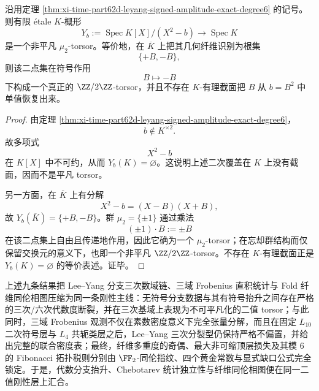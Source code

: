 \begin{proposition}\label{prop:xi-time-part62d-leyang-square-root-nontrivial-torsor}
沿用定理 \ref{thm:xi-time-part62d-leyang-signed-amplitude-exact-degree6} 的记号。则有限 \'etale \(K\)-概形
\[
Y_b:=\operatorname{Spec}K[X]/(X^2-b)
\longrightarrow
\operatorname{Spec}K
\]
是一个非平凡 \(\mu_2\)-torsor。等价地，在 \(\overline K\) 上把其几何纤维识别为根集
\[
\{+B,-B\},
\]
则该二点集在符号作用
\[
B\longmapsto -B
\]
下构成一个真正的 \(\ZZ/2\ZZ\)-torsor，并且不存在 \(K\)-有理截面把 \(B\) 从 \(b=B^2\) 中单值恢复出来。
\end{proposition}
\begin{proof}
由定理 \ref{thm:xi-time-part62d-leyang-signed-amplitude-exact-degree6}，
\[
b\notin K^{\times 2}.
\]
故多项式
\[
X^2-b
\]
在 \(K[X]\) 中不可约，从而 \(Y_b(K)=\varnothing\)。这说明上述二次覆盖在 \(K\) 上没有截面，因而不是平凡 torsor。

另一方面，在 \(\overline K\) 上有分解
\[
X^2-b=(X-B)(X+B),
\]
故 \(Y_b(\overline K)=\{+B,-B\}\)。群 \(\mu_2=\{\pm 1\}\) 通过乘法
\[
(\pm 1)\cdot B:=\pm B
\]
在该二点集上自由且传递地作用，因此它确为一个 \(\mu_2\)-torsor；在忘却群结构而仅保留交换元的意义下，也即一个非平凡 \(\ZZ/2\ZZ\)-torsor。不存在 \(K\)-有理截面正是 \(Y_b(K)=\varnothing\) 的等价表述。证毕。
\end{proof}

\noindent
上述九条结果把 Lee--Yang 分支三次数域链、三域 Frobenius 直积统计与 Fold 纤维同伦相图压缩为同一条刚性主线：无符号分支数据与其有符号抬升之间存在严格的三次/六次代数度断裂，并在三次基域上表现为不可平凡化的二值 torsor；与此同时，三域 Frobenius 观测不仅在素数密度意义下完全张量分解，而且在固定 \(L_{10}\) 二次符号层与 \(L_4\) 共轭类层之后，Lee--Yang 三次分裂型仍保持严格不偏置，并给出完整的联合密度表；最终，纤维多重度的奇偶、最大非可缩顶层损失及其模 \(6\) 的 Fibonacci 拓扑税则分别由 \(\FF_2\)-同伦指纹、四个黄金常数与显式缺口公式完全锁定。于是，代数分支抬升、Chebotarev 统计独立性与纤维同伦相图便在同一二值刚性层上汇合。

\endinput
